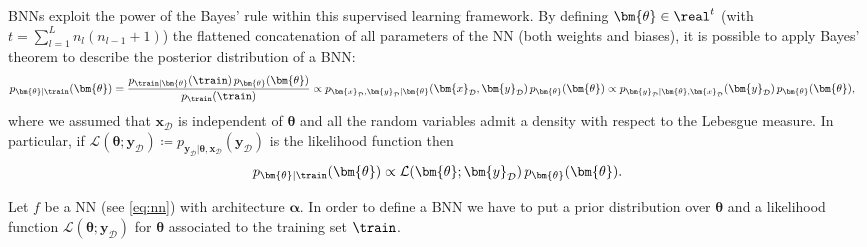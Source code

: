 BNNs exploit the power of the Bayes' rule within this supervised learning framework. 
By defining $\bm{\theta} \in \real^t$ (with $t = \sum_{l = 1}^L n_l (n_{l - 1} + 1)$) the flattened concatenation of all parameters of the NN (both weights and biases), it is possible to apply Bayes' theorem to describe the posterior distribution of a BNN:
\begin{equation*}
    \begin{aligned}
        p_{\bm{\theta} | \train}(\bm{\theta}) & = \frac{p_{\train | \bm{\theta}}(\train) \, p_{\bm{\theta}}(\bm{\theta})}{p_{\train}(\train)} 
        \propto  p_{\bm{x}_{\mathcal{D}}, \bm{y}_{\mathcal{D}} | \bm{\theta}} (\bm{x}_{\mathcal{D}}, \bm{y}_{\mathcal{D}}) \, p_{\bm{\theta}}(\bm{\theta}) 
        \propto p_{\bm{y}_{\mathcal{D}} | \bm{\theta}, \bm{x}_{\mathcal{D}}}(\bm{y}_{\mathcal{D}}) \, p_{\bm{\theta}}(\bm{\theta}),
    \end{aligned}
\end{equation*}
where we assumed that $\bm{x}_{\mathcal{D}}$ is independent of $\bm{\theta}$ and all the random variables admit a density with respect to the Lebesgue measure. In particular, if $\mathcal{L}(\bm{\theta}; \bm{y}_{\mathcal{D}}) \coloneqq p_{\bm{y}_{\mathcal{D}} | \bm{\theta}, \bm{x}_{\mathcal{D}}}(\bm{y}_{\mathcal{D}})$ is the likelihood function then
\begin{equation} \label{eq:bayesbnn}
    p_{\bm{\theta} | \train}(\bm{\theta}) \propto \mathcal{L}(\bm{\theta}; \bm{y}_{\mathcal{D}}) \, p_{\bm{\theta}}(\bm{\theta}).
\end{equation}

\begin{definition}[BNN] \label{def:bnn}
    Let $f$ be a NN (see \cref{eq:nn}) with architecture $\bm{\alpha}$. In order to define a BNN we have to put a prior distribution over $\bm{\theta}$ and a likelihood function $\mathcal{L}(\bm{\theta}; \bm{y}_{\mathcal{D}})$ for $\bm{\theta}$ associated to the training set $\train$.
\end{definition}

